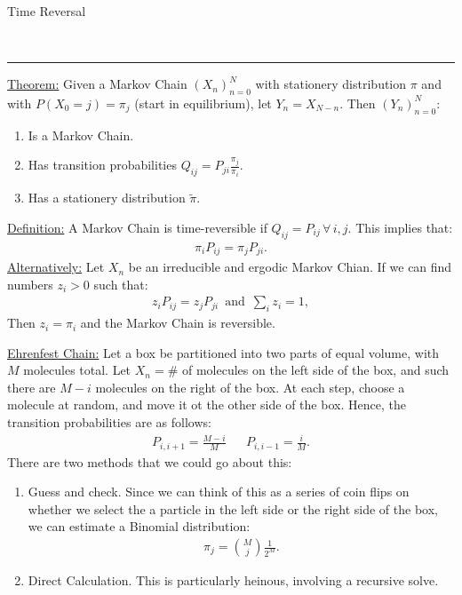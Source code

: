 \documentclass{article}
\newcommand{\header}[1]{\begin{large}\noindent #1\end{large}\\\rule{\textwidth}{0.5pt}}
\newcommand{\sheader}[1]{\underline{#1:}}
\begin{document}
\header{Time Reversal}

\sheader{Theorem} Given a Markov Chain $(X_n)_{n=0}^N$ with 
stationery distribution $\pi$ and with $P(X_0=j) = \pi_j$ 
(start in equilibrium), let $Y_n = X_{N-n}$. Then $(Y_n)_{n=0}^N$:
\begin{enumerate}
    \item Is a Markov Chain.
    \item Has transition probabilities $Q_{ij} = P_{ji}\frac{\pi_j}{\pi_i}$.
    \item Has a stationery distribution $\widetilde{\pi}$.
\end{enumerate}
\sheader{Definition} A Markov Chain is time-reversible if $Q_{ij} = P_{ij} \, \forall\, i,j$.
This implies that: 
\begin{align*}
    \pi_i P_{ij} = \pi_j P_{ji}.
\end{align*}
\sheader{Alternatively} Let $X_n$ be an irreducible and ergodic Markov Chian.
If we can find numbers $z_i >0$ such that:
\begin{align*}
    z_i P_{ij} = z_j P_{ji} \,\textrm{   and   }\, \sum_{i}z_i = 1,
\end{align*}
Then $z_i = \pi_i$ and the Markov Chain is reversible.

\pagebreak

\sheader{Ehrenfest Chain} Let a box be partitioned into two parts of equal 
volume, with $M$ molecules total. Let $X_n = \#$ of molecules on the left 
side of the box, and such there are $M-i$ molecules on the right of the box.
At each step, choose a molecule at random, and move it ot the other 
side of the box. Hence, the transition probabilities are as follows:
\begin{align*}
    P_{i, i+1} = \frac{M-i}{M} && P_{i, i-1} = \frac{i}{M}.
\end{align*}
There are two methods that we could go about this:
\begin{enumerate}
    \item Guess and check. Since we can think of this as a series of coin 
    flips on whether we select the a particle in the left side or the right 
    side of the box, we can estimate a Binomial distribution:
    \begin{align*}
        \pi_j = \binom{M}{j} \frac{1}{2^M}.
    \end{align*}
    \item Direct Calculation. This is particularly heinous, involving 
    a recursive solve.
\end{enumerate}
\end{document}
